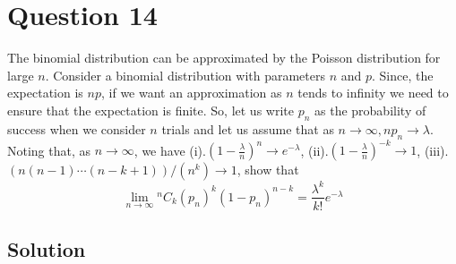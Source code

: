 \section*{Question 14}

The binomial distribution can be approximated by the Poisson distribution for large \( n \).
Consider a binomial distribution with parameters \( n \) and \( p \).
Since, the expectation is \( n p \), if we want an approximation as \( n \) tends to infinity we need to ensure that the expectation is finite.
So, let us write \( p_{n} \) as the probability of success when we consider \( n \) trials and let us assume that as \( n \rightarrow \infty, n p_{n} \rightarrow \lambda \).
Noting that, as \( n \rightarrow \infty \), we have
(i).\( \left(1-\frac{\lambda}{n}\right)^{n} \rightarrow e^{-\lambda} \),
(ii).\( \left(1-\frac{\lambda}{n}\right)^{-k} \rightarrow 1 \),
(iii).\( (n(n-1) \cdots(n-k+1)) /\left(n^{k}\right) \rightarrow 1 \), show that
\begin{equation*}
    \lim _{n \rightarrow \infty}{ }^{n} C_{k}\left(p_{n}\right)^{k}\left(1-p_{n}\right)^{n-k}=\frac{\lambda^{k}}{k!} e^{-\lambda}
\end{equation*}

\subsection*{Solution}

